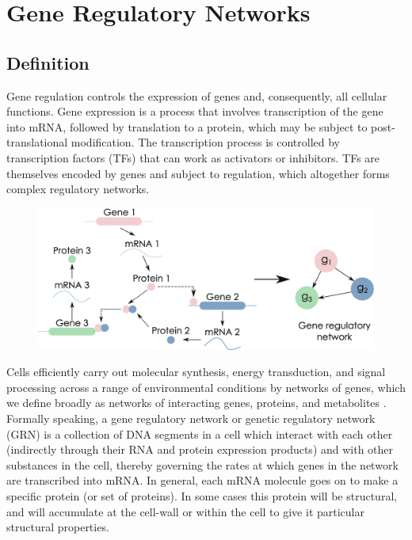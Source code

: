 \chapter{Gene Regulatory Networks}\label{grn}
\lhead[\fancyplain{}{\bfseries\thepage}]{\fancyplain{}{\bfseries\rightmark}}


\section{Definition}

Gene regulation controls the expression of genes and, consequently, all cellular functions. Gene expression is a process that involves transcription of the gene into mRNA, followed by translation to a protein, which may be subject to post-translational modification. The transcription process is controlled by transcription factors (TFs) that can work as activators or inhibitors. TFs are themselves encoded by genes and subject to regulation, which altogether forms complex regulatory networks. 
\begin{figure}
\centering
\includegraphics{GRN.png}
\end{figure}
Cells efficiently carry out molecular synthesis, energy transduction, and signal processing across a range of environmental conditions by networks of genes, which we define broadly as networks of interacting genes, proteins, and metabolites \cite{K37}. Formally speaking, a gene regulatory network or genetic regulatory network (GRN) is a collection of DNA segments in a cell which interact with each other (indirectly through their RNA and protein expression products) and with other substances in the cell, thereby governing the rates at which genes in the network are transcribed into mRNA. In general, each mRNA molecule goes on to make a specific protein (or set of proteins). In some cases this protein will be structural, and will accumulate at the cell-wall or within the cell to give it particular structural properties. 

